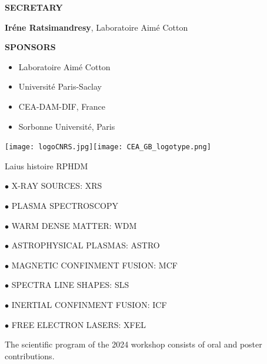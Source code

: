 \documentclass[11pt,a4paper]{report}
\begin{document}
\par\vspace{.5cm}
\begin{Large}
         {\bf SECRETARY}
\end{Large}

\hspace{1.cm} {\bf Ir\'ene Ratsimandresy}, Laboratoire Aimé Cotton





\newpage\thispagestyle{empty}
\begin{center}
\begin{Large}
         {\bf SPONSORS}
\end{Large}
\begin{itemize}
\item Laboratoire Aim\'e Cotton 
\item Universit\'e Paris-Saclay
\item CEA-DAM-DIF, France
\item Sorbonne Universit\'e, Paris
\end{itemize}
\texttt{[image: logoCNRS.jpg]}\hspace{2cm}\texttt{[image: CEA\_GB\_logotype.png]}\\
\par\vspace{.5cm}
\end{center}

\newpage\thispagestyle{empty}
Laius histoire RPHDM

\begin{large}
\end{large}

$\bullet$ X-RAY SOURCES: XRS

$\bullet$ PLASMA SPECTROSCOPY

$\bullet$ WARM DENSE MATTER: WDM

$\bullet$ ASTROPHYSICAL PLASMAS: ASTRO

$\bullet$ MAGNETIC CONFINMENT FUSION: MCF

$\bullet$ SPECTRA LINE SHAPES: SLS

$\bullet$ INERTIAL CONFINMENT FUSION: ICF

$\bullet$ FREE ELECTRON LASERS: XFEL

The scientific program of the 2024 workshop consists of oral and poster contributions.

\end{document}
